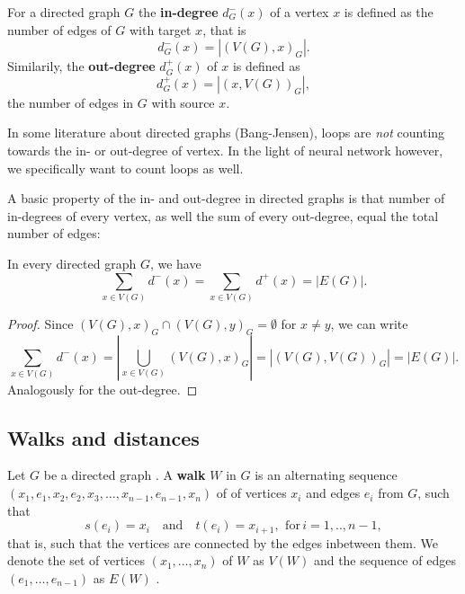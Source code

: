 \begin{remark} 
  For a directed graph $G$ the \textbf{in-degree} $d^-_G(x)$ of a
  vertex $x$ is defined as the number of edges of $G$ with target $x$,
  that is
  \[
  d^-_G(x) = \left|(V(G),x)_G\right|.
  \]
  Similarily, the \textbf{out-degree} $d^+_G(x)$ of $x$ is defined as
  \[
  d^+_G(x) = \left|(x, V(G))_G\right|,
  \]
  the number of edges in $G$ with source $x$.
\end{remark}

\begin{remark}[Side]
  In some literature about directed graphs (Bang-Jensen), loops are
  \textit{not} counting towards the in- or out-degree of vertex. In
  the light of neural network however, we specifically want to count
  loops as well.
\end{remark}

A basic property of the in- and out-degree in directed graphs is that
number of in-degrees of every vertex, as well the sum of every
out-degree, equal the total number of edges:

\begin{proposition}
  In every directed graph $G$, we have
  \[
  \sum_{x \in V(G)} d^-(x) = \sum_{x \in V(G)} d^+(x) = | E(G) |.
  \]
\end{proposition}

\begin{proof}
  Since $(V(G),x)_G \cap (V(G),y)_G = \emptyset$ for $x \ne y$, we can
  write
  \[
  \sum_{x \in V(G)} d^-(x) = \left| \bigcup_{x \in V(G)} (V(G),x)_G
  \right| = \left| (V(G),V(G))_G \right| = | E(G) |.
  \]
  Analogously for the out-degree.
\end{proof}


\subsection*{Walks and distances}

Let $G$ be a directed graph . A
\textbf{walk} $W$ in $G$ is an alternating sequence
$(x_1,e_1,x_2,e_2,x_3,\ldots,x_{n-1},e_{n-1},x_n)$ of of vertices
$x_i$ and edges $e_i$ from $G$, such that
\[
s(e_i) = x_i \quad \mathrm{and} \quad t(e_i) = x_{i+1}, \:\,
\mathrm{for}\, i=1,..,n-1,
\]
that is, such that the vertices are connected by the edges inbetween
them. We denote the set of vertices $(x_1,\ldots,x_n)$ of $W$ as
$V(W)$ and the sequence of edges $(e_1,\dots,e_{n-1})$ as $E(W)$
.

